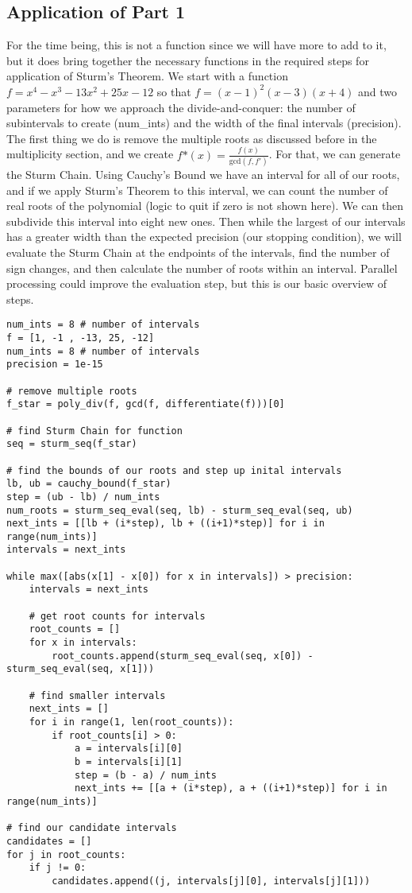 \documentclass[]{article}
\theoremstyle{definition}
\begin{document}
\subsection{Application of Part 1}
For the time being, this is not a function since we will have more to add to it, but it does bring together the necessary functions in the required steps for application of Sturm's Theorem.
We start with a function $f = x^4 - x^3 - 13x^2 + 25x - 12$ so that $f = (x - 1)^2(x - 3)(x + 4)$ and two parameters for how we approach the divide-and-conquer: the number of subintervals to create (num\_ints) and the width of the final intervals (precision).
The first thing we do is remove the multiple roots as discussed before in the multiplicity section, and we create $f\textrm{*}(x) = \frac{f(x)}{\textrm{gcd}(f, f')}$. 
For that, we can generate the Sturm Chain. Using Cauchy's Bound we have an interval for all of our roots, and if we apply Sturm's Theorem to this interval, we can count the number of real roots of the polynomial (logic to quit if zero is not shown here). 
We can then subdivide this interval into eight new ones. Then while the largest of our intervals has a greater width than the expected precision (our stopping condition), we will evaluate the Sturm Chain at the endpoints of the intervals, find the number of sign changes, and then calculate the number of roots within an interval. Parallel processing could improve the evaluation step, but this is our basic overview of steps. 
\begin{lstlisting}
num_ints = 8 # number of intervals
f = [1, -1 , -13, 25, -12]
num_ints = 8 # number of intervals
precision = 1e-15

# remove multiple roots
f_star = poly_div(f, gcd(f, differentiate(f)))[0]

# find Sturm Chain for function
seq = sturm_seq(f_star)

# find the bounds of our roots and step up inital intervals
lb, ub = cauchy_bound(f_star)
step = (ub - lb) / num_ints
num_roots = sturm_seq_eval(seq, lb) - sturm_seq_eval(seq, ub)
next_ints = [[lb + (i*step), lb + ((i+1)*step)] for i in range(num_ints)]
intervals = next_ints

while max([abs(x[1] - x[0]) for x in intervals]) > precision:
    intervals = next_ints

    # get root counts for intervals
    root_counts = []
    for x in intervals:
        root_counts.append(sturm_seq_eval(seq, x[0]) - sturm_seq_eval(seq, x[1]))

    # find smaller intervals 
    next_ints = []
    for i in range(1, len(root_counts)):
        if root_counts[i] > 0:
            a = intervals[i][0]
            b = intervals[i][1]
            step = (b - a) / num_ints
            next_ints += [[a + (i*step), a + ((i+1)*step)] for i in range(num_ints)]
            
# find our candidate intervals
candidates = []
for j in root_counts:
    if j != 0:
        candidates.append((j, intervals[j][0], intervals[j][1]))
\end{lstlisting}
\end{document}
